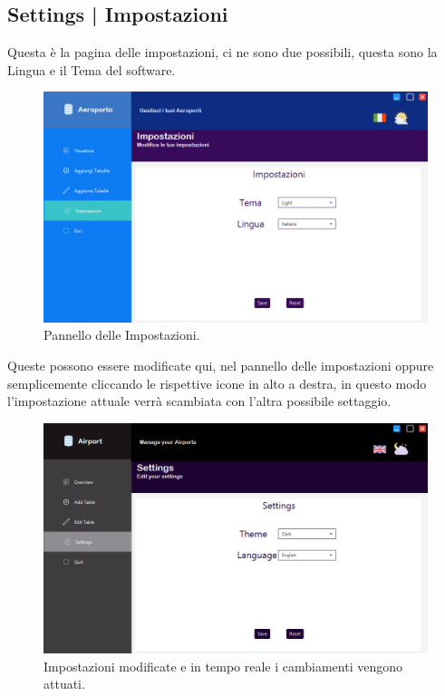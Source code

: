 
\newpage

\enlargethispage{1\linewidth}

\subsection{Settings | Impostazioni}

\textsf{\small Questa è la pagina delle impostazioni, ci ne sono due possibili, questa sono la Lingua e il Tema del software.}

\begin{figure}[H] 
	\centering
	\includegraphics[width=1\textwidth, height=1\textheight, keepaspectratio]{./img/Applicativo/settings.png}
	\caption{Pannello delle Impostazioni.}
	\label{fig:settings1}
\end{figure}

\textsf{\small Queste possono essere modificate qui, nel pannello delle impostazioni oppure semplicemente cliccando le rispettive icone in alto a destra, in questo modo l'impostazione attuale verrà scambiata con l'altra possibile settaggio.}

\begin{figure}[H] 
	\centering
	\includegraphics[width=1\textwidth, height=1\textheight, keepaspectratio]{./img/Applicativo/settings_change_language_and_theme.png}
	\caption{Impostazioni modificate e in tempo reale i cambiamenti vengono attuati.}
	\label{fig:settings2}
\end{figure}


